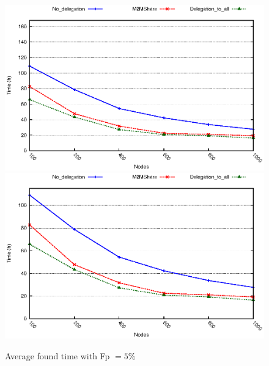 \begin{figure}[htbp]
\centering%
\subfigure%
{\includegraphics{grafici/tempiVF_Fp5.eps}}\qquad\qquad
\subfigure%
{\includegraphics{grafici/tempiVF_Fp5_zoom.eps}}
\caption{Average found time with Fp $= 5\%$\label{graficiTempiVF_Fp5}}
\end{figure}

